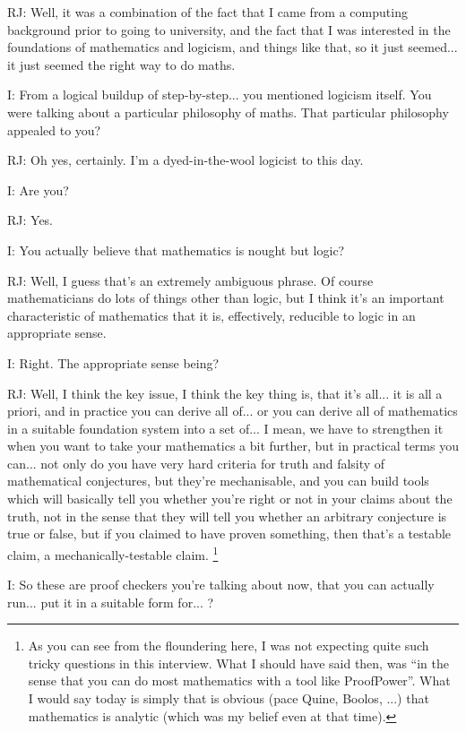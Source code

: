 \documentclass[10pt,titlepage]{book}
\begin{document}
RJ: Well, it was a combination of the fact that I came from a computing background prior to going to university, and the fact that I was interested in the foundations of mathematics and logicism, and things like that, so it just seemed... it just seemed the right way to do maths.

I: From a logical buildup of step-by-step... you mentioned logicism itself.
You were talking about a particular philosophy of maths.
That particular philosophy appealed to you?

RJ: Oh yes, certainly.
I'm a dyed-in-the-wool logicist to this day.

I: Are you?

RJ: Yes.

I: You actually believe that mathematics is nought but logic?

RJ: Well, I guess that's an extremely ambiguous phrase.
Of course mathematicians do lots of things other than logic, but I think it's an important characteristic of mathematics that it is, effectively, reducible to logic in an appropriate sense.

I: Right.
The appropriate sense being?

RJ: Well, I think the key issue, I think the key thing is, that it's all... it is all a priori, and in practice you can derive all of... or you can derive all of mathematics in a suitable foundation system into a set of... I mean, we have to strengthen it when you want to take your mathematics a bit further, but in practical terms you can... not only do you have very hard criteria for truth and falsity of mathematical conjectures, but they're mechanisable, and you can build tools which will basically tell you whether you're right or not in your claims about the truth, not in the sense that they will tell you whether an arbitrary conjecture is true or false, but if you claimed to have proven something, then that's a testable claim, a mechanically-testable claim.%
\footnote{As you can see from the floundering here, I was not expecting quite such tricky questions in this interview.
What I should have said then, was ``in the sense that you can do most mathematics with a tool like ProofPower''.
What I would say today is simply that is obvious (pace Quine, Boolos, ...) that mathematics is analytic (which was my belief even at that time). 
}

I: So these are proof checkers you're talking about now, that you can actually run... put it in a suitable form for... ?
\end{document}
